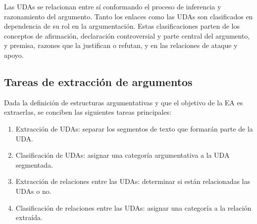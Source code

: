 \documentclass[a4paper,11pt,twocolumn,twoside]{article}
\begin{document}
Las UDAs se relacionan entre sí conformando el proceso de inferencia y razonamiento del argumento.
Tanto los enlaces como las UDAs son clasificados en dependencia de su rol en la argumentación. Estas clasificaciones 
parten de los conceptos de afirmación, declaración controversial y parte central del argumento, y premisa, %
razones que la justifican o refutan, y en las relaciones de ataque y apoyo. 

\subsection{Tareas de extracción de argumentos}

Dada la definición de estructuras argumentativas y que el objetivo de la EA es extraerlas,
se conciben las siguientes tareas principales:

\begin{enumerate}
	\item Extracción de UDAs: separar los segmentos de texto que formarán parte de la UDA.
	\item Clasificación de UDAs: asignar una categoría argumentativa a la UDA segmentada.
	\item Extracción de relaciones entre las UDAs: determinar si están relacionadas las UDAs o no.
	\item Clasificación de relaciones entre las UDAs: asignar una categoría a la relación extraída.
\end{enumerate}



\end{document}
